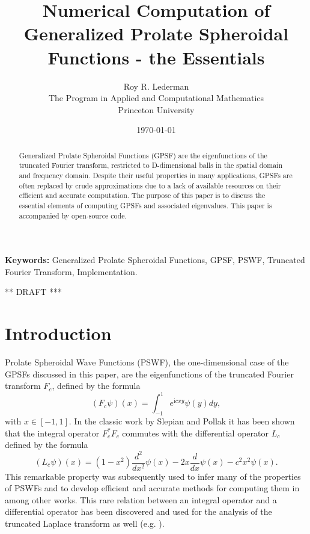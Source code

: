 \documentclass[12pt]{article}
\title{Numerical Computation of Generalized Prolate Spheroidal Functions - the Essentials}
\date{\today}
\author{Roy R. Lederman\\ \small The Program in Applied and Computational Mathematics\\ \small Princeton University}
\begin{document}
\maketitle


%
%
%
\begin{abstract}
  Generalized Prolate Spheroidal Functions (GPSF) are the eigenfunctions of the truncated Fourier transform, restricted to D-dimensional balls in the spatial domain and frequency domain. Despite their useful properties in many applications, GPSFs are often replaced by crude approximations due to a lack of available resources on their efficient and accurate computation.
  The purpose of this paper is to discuss the essential elements of computing GPSFs and associated eigenvalues.
  This paper is accompanied by open-source code.   
  \end{abstract}
{\bf Keywords:} Generalized Prolate Spheroidal Functions, GPSF, PSWF, Truncated Fourier Transform, Implementation.


%
%
\begin{center}
{\Huge *** DRAFT ***}
\end{center}


\section{Introduction}\label{sec:intro}

Prolate Spheroidal Wave Functions (PSWF), the one-dimensional case of the GPSFs discussed in this paper, 
are the eigenfunctions of the truncated Fourier transform $F_c$, defined by the formula
\begin{equation}
  \left(F_c\psi\right)(x)   = \int_{-1}^1 e^{\mathrm{i} cxy} \psi(y) dy ,
\end{equation}
with $x \in [-1,1]$. 
In the classic work \cite{slepian1961prolate} by Slepian and Pollak it has been shown that the integral operator $F_c ^*F_c$ 
commutes with the differential operator $L_c$ defined by the formula
\begin{equation}
   \left(L_c\psi\right)(x) = (1-x^2) \frac{d^2}{dx^2}\psi(x) - 2x \frac{d}{dx}\psi(x) -c^2 x^2 \psi(x).
\end{equation}
This remarkable property was subsequently used to infer many of the properties of PSWFs and to develop efficient and accurate methods for computing them in \cite{slepian1961prolate,xiao2001prolate,xiao2003high,rokhlin2007approximate,osipov2013prolate,lederman2017lower} among other works. 
This rare relation between an integral operator and a differential operator has been discovered and used for the analysis of the truncated Laplace transform as well (e.g. \cite{bertero1985commuting,LedermanLaplace2,lederman2017lower}).
\end{document}

